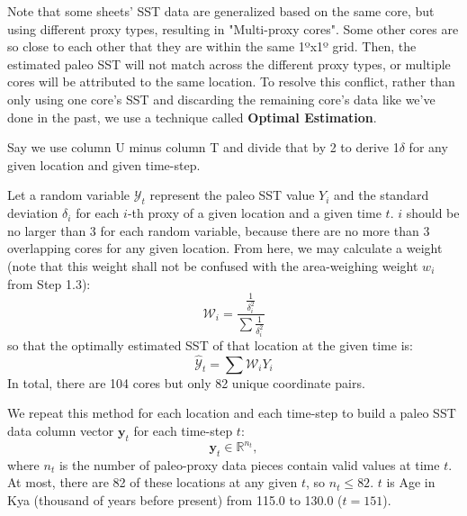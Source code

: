\documentclass{article}
\begin{document}
Note that some sheets' SST data are generalized based on the same core, but using different proxy types, resulting in "Multi-proxy cores".
Some other cores are so close to each other that they are within the same 1ºx1º grid.
Then, the estimated paleo SST will not match across the different proxy types, or multiple cores will be attributed to the same location.
To resolve this conflict, rather than only using one core's SST and discarding the remaining core's data like we've done in the past, we use a technique called \textbf{Optimal Estimation}.

Say we use column U minus column T and divide that by 2 to derive 1$\delta$ for any given location and given time-step.

Let a random variable $\mathcal{Y}_t$ represent the paleo SST value $Y_i$ and the standard deviation $\delta_i$ for each $i$-th proxy of a given location and a given time $t$. 
$i$ should be no larger than 3 for each random variable, because there are no more than 3 overlapping cores for any given location. 
From here, we may calculate a weight (note that this weight shall not be confused with the area-weighing weight $w_i$ from Step 1.3):
$$\mathcal{W}_i = \frac{\frac{1}{\delta_i^2}}{\sum \frac{1} {\delta_i^2}}$$
so that the optimally estimated SST of that location at the given time is:
$$\hat{\mathcal{Y}}_t = \sum \mathcal{W}_i Y_i$$
In total, there are 104 cores but only 82 unique coordinate pairs.


We repeat this method for each location and each time-step to build a paleo SST data column vector $\textbf{y}_t$ for each time-step $t$:
$$\textbf{y}_t \in \mathbb{R}^{n_t},$$
where $n_t$ is the number of paleo-proxy data pieces contain valid values at time $t$. At most, there are 82 of these locations at any given $t$, so $n_t \leq 82$. 
$t$ is Age in Kya (thousand of years before present) from 115.0 to 130.0 ($t=151$).
\end{document}

